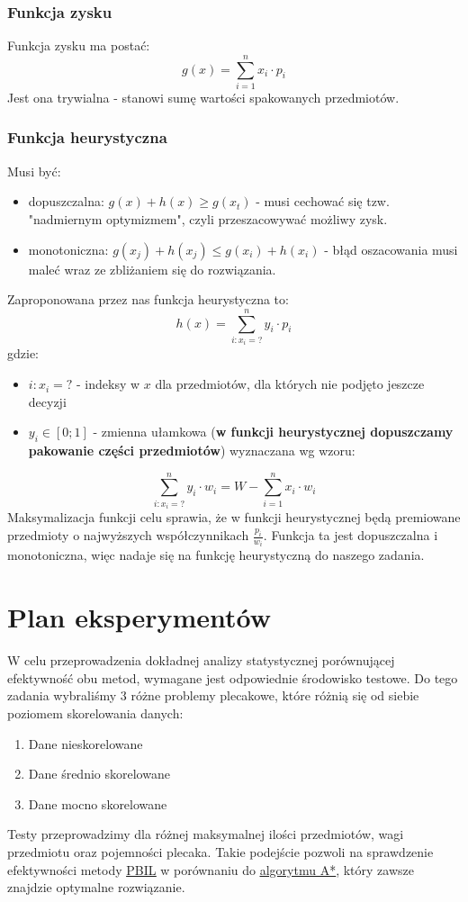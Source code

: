\documentclass[11pt]{article}
\begin{document}
\subsubsection{Funkcja zysku}
\label{sec:orgf97f734}

Funkcja zysku ma postać:
$$
g(x) = \sum_{i = 1}^n x_i \cdot p_i
$$
Jest ona trywialna - stanowi sumę wartości spakowanych przedmiotów.
\subsubsection{Funkcja heurystyczna}
\label{sec:org8963b0e}
Musi być:
\begin{itemize}
\item dopuszczalna: $g(x) + h(x) \ge g(x_t)$ - musi cechować się tzw. "nadmiernym optymizmem", czyli przeszacowywać możliwy zysk.
\item monotoniczna: $g(x_j)+h(x_j) \le g(x_i) + h(x_i)$ - błąd oszacowania musi maleć wraz ze zbliżaniem się do rozwiązania.
\end{itemize}
Zaproponowana przez nas funkcja heurystyczna to:
$$
h(x) = \sum_{i:x_i=?}^n y_i \cdot p_i
$$
gdzie:
\begin{itemize}
\item $i: x_i = ?$ - indeksy w $x$ dla przedmiotów, dla których nie podjęto jeszcze decyzji
\item $y_i \in [0;1]$ - zmienna ułamkowa (\textbf{w funkcji heurystycznej dopuszczamy pakowanie części przedmiotów}) wyznaczana wg wzoru:
\end{itemize}
$$
\sum_{i:x_i=?}^n y_i \cdot w_i = W - \sum_{i=1}^n x_i \cdot w_i
$$
Maksymalizacja funkcji celu sprawia, że w funkcji heurystycznej będą premiowane przedmioty o najwyższych współczynnikach $\frac{p_i}{w_i}$. Funkcja ta jest dopuszczalna i monotoniczna, więc nadaje się na funkcję heurystyczną do naszego zadania.

\section{Plan eksperymentów}
\label{sec:org78ee836}
W celu przeprowadzenia dokładnej analizy statystycznej porównującej efektywność obu metod, wymagane jest odpowiednie środowisko testowe. Do tego zadania wybraliśmy 3 różne problemy plecakowe, które różnią się od siebie poziomem skorelowania danych:
\begin{enumerate}
\item Dane nieskorelowane
\item Dane średnio skorelowane
\item Dane mocno skorelowane
\end{enumerate}
Testy przeprowadzimy dla różnej maksymalnej ilości przedmiotów, wagi przedmiotu oraz pojemności plecaka. Takie podejście pozwoli na sprawdzenie efektywności metody \uline{\hyperref[sec:org5c31017]{PBIL}} w porównaniu do \hyperref[sec:orgd1b064a]{\uline{algorytmu A*}}, który zawsze znajdzie optymalne rozwiązanie. 
\end{document}

